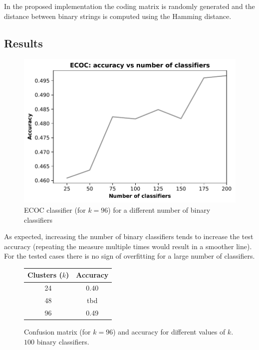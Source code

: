 \documentclass[12pt]{article}
\begin{document}
  In the proposed implementation the coding matrix is randomly generated and the distance between binary strings is computed using the Hamming distance.


  \subsection*{Results}

  \begin{figure}[H]
    \centering
    \caption*{ECOC classifier (for \( k = 96 \)) for a different number of binary classifiers}
    \includegraphics[width=.6\linewidth]{img/ecocb.pdf}
  \end{figure}

  As expected, increasing the number of binary classifiers tends to increase the test accuracy (repeating the measure multiple times would result in a smoother line). For the tested cases there is no sign of overfitting for a large number of classifiers.


  \begin{figure}[H]
    \centering
    \caption*{Confusion matrix (for \( k = 96 \)) and accuracy for different values of \( k \). \( 100 \) binary classifiers.}
    \quad\quad\quad
    \begin{tabular}[b]{cc}
			\toprule
      Clusters (\( k \)) & Accuracy \\
      \midrule
      24  & 0.40 \\
      48  & tbd \\
      96  & 0.49 \\
      \bottomrule
    \end{tabular}
  \end{figure}
\end{document}
